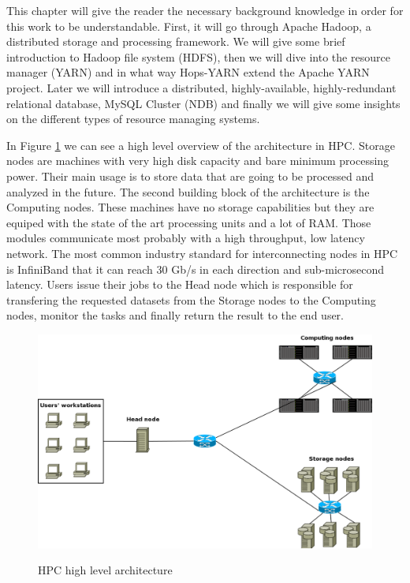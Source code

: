 This chapter will give the reader the necessary background knowledge
in order for this work to be understandable. First, it will go through
Apache Hadoop, a distributed storage and processing framework. We will
give some brief introduction to Hadoop file system (HDFS), then we
will dive into the
resource manager (YARN) and in what way Hops-YARN extend the Apache
YARN project. Later we will introduce a distributed, highly-available,
highly-redundant relational database, MySQL Cluster (NDB) and finally
we will give some insights on the different types of resource managing
systems.

In Figure \ref{fig:back_hpc_arch_overview} we can see a high level
overview of the architecture in HPC. Storage nodes are machines with very high disk capacity and bare
minimum processing power. Their main usage is to store data that are
going to be processed and analyzed in the future. The second building
block of the architecture is the Computing nodes. These machines have
no storage capabilities but they are equiped with the state of the art
processing units and a lot of RAM. Those modules communicate most
probably with a high throughput, low latency network. The most common
industry standard for interconnecting nodes in HPC is InfiniBand
\cite{infiniband} that it can
reach 30 Gb/s in each direction and sub-microsecond latency. Users
issue their jobs to the Head node which is responsible for transfering
the requested datasets from the Storage nodes to the Computing nodes,
monitor the tasks and finally return the result to the end user.

\begin{figure}
\centering
\includegraphics[scale=0.35]{resources/images/Background/hpc_arch_overview.png}
\label{fig:back_hpc_arch_overview}
\caption{HPC high level architecture}
\end{figure}


